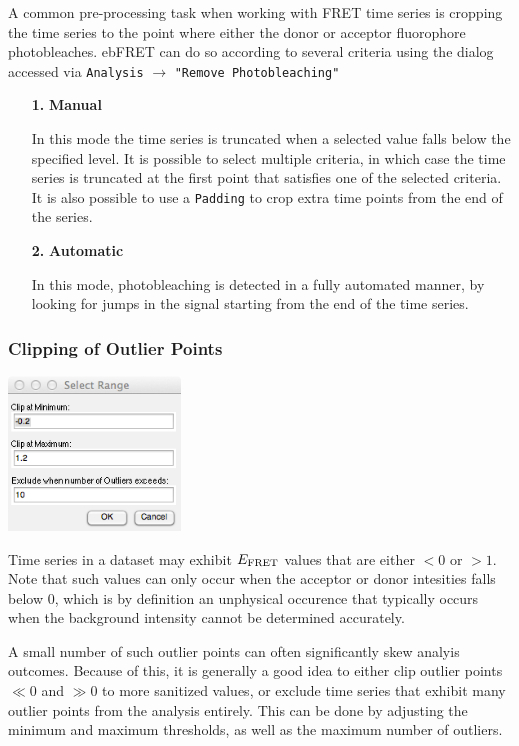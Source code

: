 \documentclass[12pt,article,oldfontcommands]{memoir}
\newcommand{\indt}{\qquad}
\begin{document}
A common pre-processing task when working with FRET time series is cropping the time series to the point where either the donor or acceptor fluorophore photobleaches. ebFRET can do so according to several criteria using the dialog accessed via \texttt{Analysis} $\to$ \texttt{"Remove Photobleaching"} 

\begin{itemize}
\item[\textbf{1.}] \textbf{Manual}

In this mode the time series is truncated when a selected value falls below the specified level. It is possible to select multiple criteria, in which case the time series is truncated at the first point that satisfies one of the selected criteria. It is also possible to use a \texttt{Padding} to crop extra time points from the end of the series.

\item[\textbf{2.}] \textbf{Automatic}

In this mode, photobleaching is detected in a fully automated manner, by looking for jumps in the signal starting from the end of the time series. 
\end{itemize}

\subsubsection{Clipping of Outlier Points}

\indt\includegraphics[width=1.8in]{images/clip_outliers_dialog}

Time series in a dataset may exhibit $E_{\rm FRET}$ values that are either $< 0$  or $> 1$. Note that such values can only occur when the acceptor or donor intesities falls below 0, which is by definition an unphysical occurence that typically occurs when the background intensity cannot be determined accurately.

A small number of such outlier points can often significantly skew analyis outcomes. Because of this, it is generally a good idea to either clip outlier points $\ll 0$ and $\gg 0$ to more sanitized values, or exclude time series that exhibit many outlier points from the analysis entirely.
This can be done by adjusting the minimum and maximum thresholds, as well as the maximum number of outliers.
\end{document}
